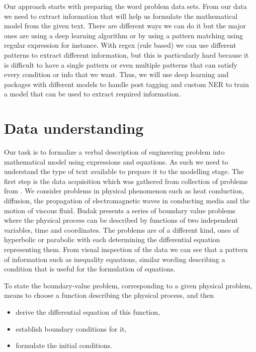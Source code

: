 Our approach starts with preparing the word problem data sets. From our data we need to extract information that will help us formulate the mathematical model from the given text. There are different ways we can do it but the major ones are using a deep learning algorithm or by using a pattern matching using regular expression for instance. 
With regex (rule based) we can use different patterns to extract different information, but this is particularly hard because it is difficult to have a single pattern or even multiple patterns that can satisfy every condition or info that we want. 
Thus, we will use deep learning and packages with different models to handle post tagging and custom NER to train a model that can be used to extract required information. 

\section{Data understanding} 
Our task is to formalize a verbal description of engineering problem into mathematical model using expressions and equations. As such we need to understand the type of text available to prepare it to the modelling stage. 
The first step is the data acquisition which was gathered from collection of problems from \parencite{budak1965collection}.
We consider problems in physical phenomenon such as heat conduction, diffusion, the propagation of electromagnetic waves in conducting media and the motion of viscous fluid. 
Budak presents a series of boundary value problems where the physical process can be described by functions of two independent variables, time and coordinates.  
The problems are of a different kind, ones of hyperbolic or parabolic with each determining the differential equation representing them. 
From visual inspection of the data we can see that a pattern of information such as inequality equations, similar wording describing a condition that is useful for the formulation of equations.

To state the boundary-value problem, corresponding to a given physical problem, means to choose a function describing the physical process, and then
\begin{itemize}
    \item derive the differential equation of this function,
    \item establish boundary conditions for it,
    \item formulate the initial conditions.
\end{itemize}

